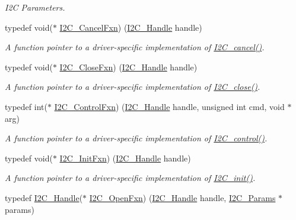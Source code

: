 \begin{DoxyCompactItemize}
\begin{DoxyCompactList}\small\item\em I2\+C Parameters. \end{DoxyCompactList}\item 
typedef void($\ast$ \hyperlink{_i2_c_8h_a7a829a2a0fd594c50e93c3e55c7d04aa}{I2\+C\+\_\+\+Cancel\+Fxn}) (\hyperlink{_i2_c_8h_a5809a229f8395c87f59e63128195c1bf}{I2\+C\+\_\+\+Handle} handle)
\begin{DoxyCompactList}\small\item\em A function pointer to a driver-\/specific implementation of \hyperlink{_i2_c_8h_a8cad0c04a9eca0fffc0ffe5586a5179b}{I2\+C\+\_\+cancel()}. \end{DoxyCompactList}\item 
typedef void($\ast$ \hyperlink{_i2_c_8h_a083200108e980a0ef61e458f0b9fb9e7}{I2\+C\+\_\+\+Close\+Fxn}) (\hyperlink{_i2_c_8h_a5809a229f8395c87f59e63128195c1bf}{I2\+C\+\_\+\+Handle} handle)
\begin{DoxyCompactList}\small\item\em A function pointer to a driver-\/specific implementation of \hyperlink{_i2_c_8h_a12c86d89a687f2ee1eb980d99c32326d}{I2\+C\+\_\+close()}. \end{DoxyCompactList}\item 
typedef int($\ast$ \hyperlink{_i2_c_8h_a4b15853f98d3d5e5135b8c52b8465fff}{I2\+C\+\_\+\+Control\+Fxn}) (\hyperlink{_i2_c_8h_a5809a229f8395c87f59e63128195c1bf}{I2\+C\+\_\+\+Handle} handle, unsigned int cmd, void $\ast$arg)
\begin{DoxyCompactList}\small\item\em A function pointer to a driver-\/specific implementation of \hyperlink{_i2_c_8h_a633003582213a5098467a4e647cc52f9}{I2\+C\+\_\+control()}. \end{DoxyCompactList}\item 
typedef void($\ast$ \hyperlink{_i2_c_8h_adfb2451c8a1ce70402e43e4743c5fedf}{I2\+C\+\_\+\+Init\+Fxn}) (\hyperlink{_i2_c_8h_a5809a229f8395c87f59e63128195c1bf}{I2\+C\+\_\+\+Handle} handle)
\begin{DoxyCompactList}\small\item\em A function pointer to a driver-\/specific implementation of \hyperlink{_i2_c_8h_a9ff51ddf1d325776fef90cce0223772b}{I2\+C\+\_\+init()}. \end{DoxyCompactList}\item 
typedef \hyperlink{_i2_c_8h_a5809a229f8395c87f59e63128195c1bf}{I2\+C\+\_\+\+Handle}($\ast$ \hyperlink{_i2_c_8h_add24fcdaaf1bdef1521ce2489bf1d80e}{I2\+C\+\_\+\+Open\+Fxn}) (\hyperlink{_i2_c_8h_a5809a229f8395c87f59e63128195c1bf}{I2\+C\+\_\+\+Handle} handle, \hyperlink{struct_i2_c___params}{I2\+C\+\_\+\+Params} $\ast$params)

\end{DoxyCompactItemize}
